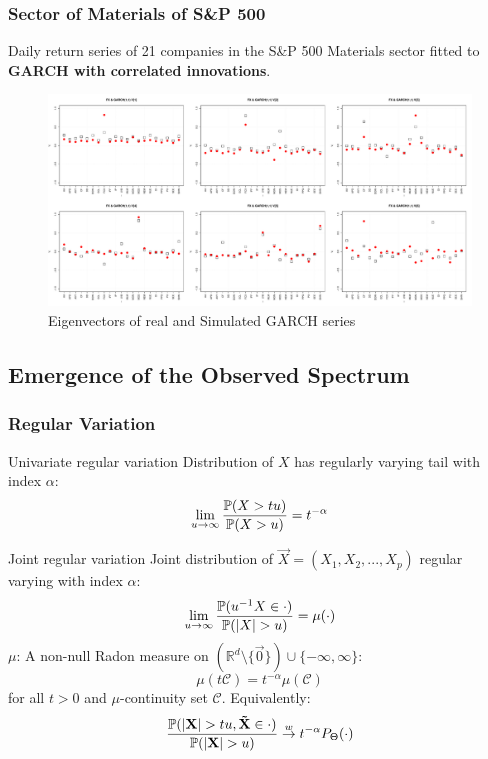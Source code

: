 \documentclass{beamer}
\begin{document}
\begin{frame}
  \frametitle{Sector of Materials of S\&P 500}
  Daily return series of 21 companies in the S\&P 500 Materials sector
  fitted to {\bf GARCH with correlated innovations}.
  \begin{figure}[htb!]
    \centering
    \includegraphics[width=1.0\linewidth]{Materials_eigenvectors1.pdf}
    \caption{\scriptsize Eigenvectors of real and Simulated GARCH series}
  \end{figure}
\end{frame}

\subsection{Emergence of the Observed Spectrum}
\begin{frame}
  \frametitle{Regular Variation}
  \begin{minipage}[t]{0.4\linewidth}
    \textcolor[HTML]{990033}{Univariate regular variation}
    Distribution of $X$ has regularly varying tail with index $\alpha$:
    \[
    \lim_{u \to \infty}
    {
      \P(X > t u)
      \over
      \P(X > u)
    } = t^{-\alpha}
    \]
  \end{minipage}\hfill
  \begin{minipage}[t]{0.55\linewidth}
    \textcolor[HTML]{990033}{Joint regular variation}    
    Joint distribution of $\vec X = (X_1, X_2, ..., X_p)$ regular varying with
    index $\alpha$:
    \[
    \lim_{u \to \infty}
    {
      \P(u^{-1} X \in \cdot)
      \over
      \P(|X|>u)
    } = \mu(\cdot)
    \]
    $\mu$: A non-null Radon measure on $(\mathbb R^d \setminus \{\vec
    0\}) \cup \{-\infty, \infty\}$:
    \[
      \mu(t \mathcal C) =
      t^{-\alpha} \mu(\mathcal C)
    \]
    for all $t > 0$ and $\mu$-continuity set $\mathcal C$. Equivalently:
    \[
    {
      \P(|\vec X| > t u, \vec{\tilde X} \in \cdot)
      \over
      \P(|\vec X| > u)
    } \overset{w}{\to} t^{-\alpha} P_\Theta(\cdot)
    \]
  \end{minipage}
\end{frame}
\end{document}
